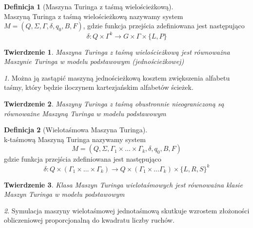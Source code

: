 \documentclass{beamer}
\newtheorem{tw}{Twierdzenie}
\theoremstyle{definition}
\newtheorem{df}{Definicja}
\theoremstyle{remark}
\newtheorem{uwaga}{}
\begin{document}
\begin{frame}
\begin{df}[Maszyna Turinga z taśmą wielościeżkową]~\\
Maszyną Turinga z taśmą wielościeżkową nazywamy system $M = (Q, \Sigma, \Gamma, \delta, q_0, B, F)$,
gdzie funkcja przejścia zdefiniowana jest następująco
\begin{equation}
\delta : Q\times\Gamma^k\rightarrow G\times\Gamma\times\{L,P\}
\end{equation}
\end{df}
\end{frame}

\begin{frame}
\begin{tw}
Maszyna Turinga z taśmą wielościeżkową jest równoważna Maszynie Turinga w modelu podstawowym (jednościeżkowej)
\end{tw}
\begin{uwaga}
Można ją zastąpić maszyną jednościeżkową kosztem zwiększenia alfabetu taśmy, który będzie
iloczynem kartezjańskim alfabetów ścieżek.
\end{uwaga}
\end{frame}

\begin{frame}
\begin{tw}
Maszyny Turinga z taśmą obustronnie nieograniczoną są równoważne Maszyną Turinga w modelu podstawowym
\end{tw}
\end{frame}

\begin{frame}
\begin{df}[Wielotaśmowa Maszyna Turinga]~\\
k-taśmową Maszyną Turinga nazywamy system
\begin{equation}
M = (Q, \Sigma, \Gamma_1\times\dots\times\Gamma_k, \delta, q_0, B, F)
\end{equation}
gdzie funkcja przejścia zdefiniowana jest następująco
\begin{equation}
\delta: Q\times(\Gamma_1\times\dots\times\Gamma_k) \rightarrow Q\times(\Gamma_1\times\dots\Gamma_k)\times\{L,R,S\}^k
\end{equation}
\end{df}
\end{frame}

\begin{frame}
\begin{tw}
Klasa Maszyn Turinga wielotaśmowych jest równoważna klasie Maszyn Turinga w modelu podstawowym
\end{tw}
\begin{uwaga}
Symulacja maszyny wielotaśmowej jednotaśmową skutkuje wzrostem złożoności obliczeniowej proporcjonalną do kwadratu liczby ruchów.
\end{uwaga}
\end{frame}
\end{document}
